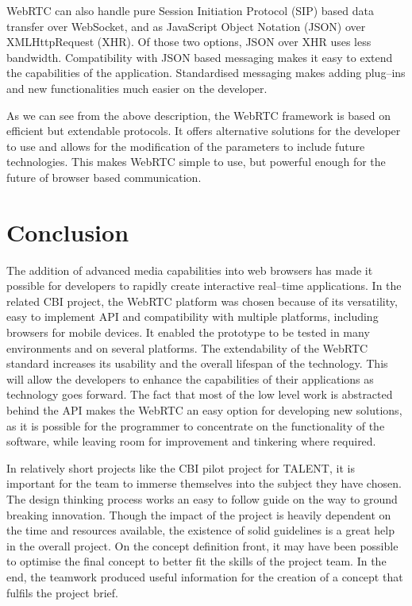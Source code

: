 \documentclass[english,12pt,a4paper,pdftex]{article}
\begin{document}
WebRTC can also handle pure Session Initiation Protocol (SIP) based data transfer over WebSocket, and as JavaScript Object Notation (JSON) over XMLHttpRequest (XHR). Of those two options, JSON over XHR uses less bandwidth. \cite{Adeyeye} Compatibility with JSON based messaging makes it easy to extend the capabilities of the application. Standardised messaging makes adding plug--ins and new functionalities much easier on the developer.

As we can see from the above description, the WebRTC framework is based on efficient but extendable protocols. It offers alternative solutions for the developer to use and allows for the modification of the parameters to include future technologies. This makes WebRTC simple to use, but powerful enough for the future of browser based communication.


\clearpage


\section{Conclusion}

The addition of advanced media capabilities into web browsers has made it possible for developers to rapidly create interactive real--time applications. In the related CBI project, the WebRTC platform was chosen because of its versatility, easy to implement API and compatibility with multiple platforms, including browsers for mobile devices. It enabled the prototype to be tested in many environments and on several platforms. The extendability of the WebRTC standard increases its usability and the overall lifespan of the technology. This will allow the developers to enhance the capabilities of their applications as technology goes forward. The fact that most of the low level work is abstracted behind the API makes the WebRTC an easy option for developing new solutions, as it is possible for the programmer to concentrate on the functionality of the software, while leaving room for improvement and tinkering where required.

In relatively short projects like the CBI pilot project for TALENT, it is important for the team to immerse themselves into the subject they have chosen. The design thinking process works an easy to follow guide on the way to ground breaking innovation. Though the impact of the project is heavily dependent on the time and resources available, the existence of solid guidelines is a great help in the overall project. On the concept definition front, it may have been possible to optimise the final concept to better fit the skills of the project team. In the end, the teamwork produced useful information for the creation of a concept that fulfils the project brief.
\end{document}

